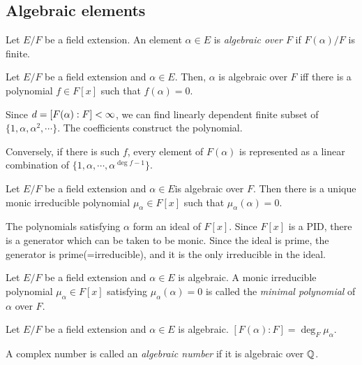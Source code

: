 \documentclass{../exp}
\begin{document}
\subsection{Algebraic elements}

\begin{defn}
Let $E/F$ be a field extension.
An element $\alpha\in E$ is \emph{algebraic over $F$} if $F(\alpha)/F$ is finite.
\end{defn}

\begin{thm}
Let $E/F$ be a field extension and $\alpha\in E$.
Then, $\alpha$ is algebraic over $F$ iff there is a polynomial $f\in F[x]$ such that $f(\alpha)=0$.
\end{thm}
\begin{pf}
Since $d=[F(\alpha):F]<\infty$, we can find linearly dependent finite subset of $\{1,\alpha,\alpha^2,\cdots\}$.
The coefficients construct the polynomial.

Conversely, if there is such $f$, every element of $F(\alpha)$ is represented as a linear combination of $\{1,\alpha,\cdots,\alpha^{\deg f-1}\}$.
\end{pf}

\begin{prop}
Let $E/F$ be a field extension and $\alpha\in E$is algebraic over $F$.
Then there is a unique monic irreducible polynomial $\mu_\alpha\in F[x]$ such that $\mu_\alpha(\alpha)=0$.
\end{prop}
\begin{pf}
The polynomials satisfying $\alpha$ form an ideal of $F[x]$.
Since $F[x]$ is a PID, there is a generator which can be taken to be monic.
Since the ideal is prime, the generator is prime(=irreducible), and it is the only irreducible in the ideal.
\end{pf}

\begin{defn}
Let $E/F$ be a field extension and $\alpha\in E$ is algebraic.
A monic irreducible polynomial $\mu_\alpha\in F[x]$ satisfying $\mu_\alpha(\alpha)=0$ is called the \emph{minimal polynomial} of $\alpha$ over $F$.
\end{defn}

\begin{thm}
Let $E/F$ be a field extension and $\alpha\in E$ is algebraic.
$[F(\alpha):F]=\deg_F\mu_\alpha$.
\end{thm}
\begin{pf}
\end{pf}


\begin{ex}
A complex number is called an \emph{algebraic number} if it is algebraic over $\mathbb{Q}$.
\end{ex}
\end{document}
